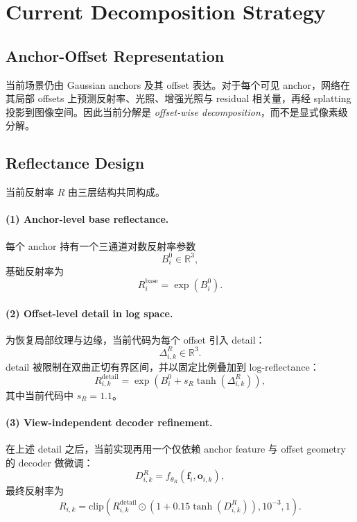 \documentclass[11pt]{article}
\begin{document}
\section{Current Decomposition Strategy}

\subsection{Anchor-Offset Representation}

当前场景仍由 Gaussian anchors 及其 offset 表达。对于每个可见 anchor，网络在其局部 offsets 上预测反射率、光照、增强光照与 residual 相关量，再经 splatting 投影到图像空间。因此当前分解是 \emph{offset-wise decomposition}，而不是显式像素级分解。

\subsection{Reflectance Design}

当前反射率 $R$ 由三层结构共同构成。

\paragraph{(1) Anchor-level base reflectance.}
每个 anchor 持有一个三通道对数反射率参数
\begin{equation}
    B_i^0 \in \mathbb{R}^3,
\end{equation}
基础反射率为
\begin{equation}
    R_i^{\text{base}} = \exp(B_i^0).
\end{equation}

\paragraph{(2) Offset-level detail in log space.}
为恢复局部纹理与边缘，当前代码为每个 offset 引入 detail：
\begin{equation}
    \Delta^R_{i,k} \in \mathbb{R}^3.
\end{equation}
detail 被限制在双曲正切有界区间，并以固定比例叠加到 log-reflectance：
\begin{equation}
    R_{i,k}^{\text{detail}}
    =
    \exp\left(B_i^0 + s_R \tanh(\Delta^R_{i,k})\right),
\end{equation}
其中当前代码中 $s_R = 1.1$。

\paragraph{(3) View-independent decoder refinement.}
在上述 detail 之后，当前实现再用一个仅依赖 anchor feature 与 offset geometry 的 decoder 做微调：
\begin{equation}
    D^R_{i,k} = f_{\theta_R}(\mathbf{f}_i, \mathbf{o}_{i,k}),
\end{equation}
最终反射率为
\begin{equation}
    R_{i,k}
    =
    \mathrm{clip}
    \left(
        R_{i,k}^{\text{detail}}
        \odot
        \left(1 + 0.15 \tanh(D^R_{i,k})\right),
        10^{-3},
        1
    \right).
\end{equation}
\end{document}
